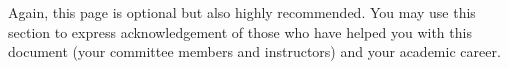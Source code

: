 Again, this page is optional but also highly recommended. You may use this section to express acknowledgement of those who have helped you with this document (your committee members and instructors) and your academic career.
